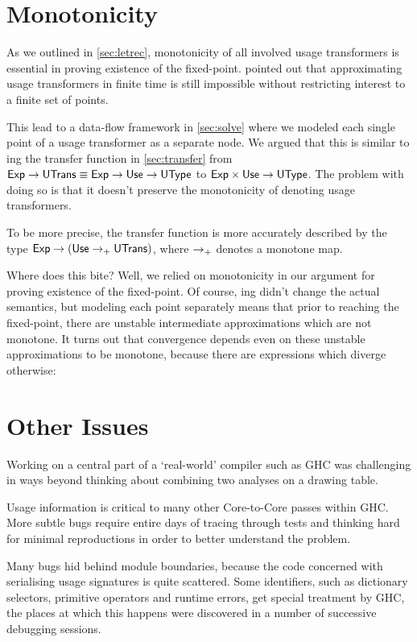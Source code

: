 \section{Monotonicity}\label{sec:mono}

As we outlined in \cref{sec:letrec}, monotonicity of all involved usage transformers is essential in proving existence of the fixed-point.
 pointed out that approximating usage transformers in finite time is still impossible without restricting interest to a finite set of points.

This lead to a data-flow framework in \cref{sec:solve} where we modeled each single point of a usage transformer as a separate node.
We argued that this is similar to ing the transfer function in \cref{sec:transfer} from $\text{\textsf{Exp}} \to \text{\textsf{UTrans}} \equiv \text{\textsf{Exp}} \to \text{\textsf{Use}} \to \text{\textsf{UType}}$ to $\text{\textsf{Exp}} \times \text{\textsf{Use}} \to \text{\textsf{UType}}$.
The problem with doing so is that it doesn't preserve the monotonicity of denoting usage transformers.

To be more precise, the transfer function is more accurately described by the type $\text{\textsf{Exp}} \to (\text{\textsf{Use}} \to_{+} \text{\textsf{UTrans}})$, where $\to_{+}$ denotes a monotone map.

Where does this bite?
Well, we relied on monotonicity in our argument for proving existence of the fixed-point.
Of course, ing didn't change the actual semantics, but modeling each point separately means that prior to reaching the fixed-point, there are unstable intermediate approximations which are not monotone.
It turns out that convergence depends even on these unstable approximations to be monotone, because there are expressions which diverge otherwise:


\section{Other Issues}

Working on a central part of a `real-world' compiler such as GHC was challenging in ways beyond thinking about combining two analyses on a drawing table.

Usage information is critical to many other Core-to-Core passes within GHC.
More subtle bugs require entire days of tracing through tests and thinking hard for minimal reproductions in order to better understand the problem.

Many bugs hid behind module boundaries, because the code concerned with serialising usage signatures is quite scattered.
Some identifiers, such as dictionary selectors, primitive operators and runtime errors, get special treatment by GHC, the places at which this happens were discovered in a number of successive debugging sessions.

